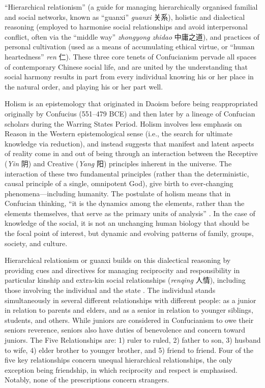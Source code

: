 {``Hierarchical relationism'' (a guide for managing hierarchically organised familial and social networks, known as ``guanxi'' \textit{guanxi} 关系), holistic and dialectical reasoning (employed to harmonise social relationships and avoid interpersonal conflict, often via the ``middle way'' \textit{zhongyong zhidao} 中庸之道), and practices of personal cultivation (used as a means of accumulating ethical virtue, or ``human heartedness'' \textit{ren} 仁).   These three core tenets of Confucianism pervade all spaces of contemporary Chinese social life, and are united by the understanding that social harmony results in part from every individual knowing his or her place in the natural order, and playing his or her part well.

Holism is an epistemology that originated in Daoism before being reappropriated originally by Confucius (551–479 BCE) and then later by a lineage of Confucian scholars during the Warring States Period.  Holism involves less emphasis on Reason in the Western epistemological sense (i.e., the search for ultimate knowledge via reduction), and instead suggests that manifest and latent aspects of reality come in and out of being through an interaction between the Receptive (\textit{Yin} 阴) and Creative (\textit{Yang} 阳) principles inherent in the universe.  The interaction of these two fundamental principles (rather than the deterministic, causal principle of a single, omnipotent God), give birth to ever-changing phenomena---including humanity.  The postulate of holism means that in Confucian thinking, ``it is the dynamics among the elements, rather than the elements themselves, that serve as the primary units of analysis'' \citep[156]{Ji2010}. In the case of knowledge of the social, it is not an unchanging human biology that should be the focal point of interest, but dynamic and evolving patterns of family, groups, society, and culture.

Hierarchical relationism or guanxi builds on this dialectical reasoning by providing cues and directives for managing reciprocity and responsibility in particular kinship and extra-kin social relationships (\textit{renqing} 人情), including those involving the individual and the state \citep{Maehr1980}.  The individual stands simultaneously in several different relationships with different people: as a junior in relation to parents and elders, and as a senior in relation to younger siblings, students, and others. While juniors are considered in Confucianism to owe their seniors reverence, seniors also have duties of benevolence and concern toward juniors. The Five Relationships are: 1) ruler to ruled, 2) father to son, 3) husband to wife, 4) elder brother to younger brother, and 5) friend to friend. Four of the five key relationships concern unequal hierarchical relationships, the only exception being friendship, in which reciprocity and respect is emphasised.  Notably, none of the prescriptions concern strangers.

}
